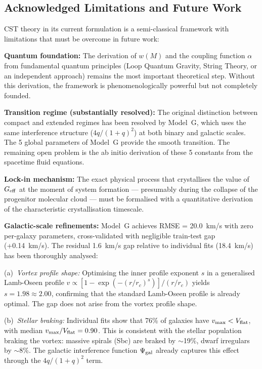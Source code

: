 \documentclass[11pt,a4paper]{article}
\begin{document}
\hypertarget{acknowledged-limitations-and-future-work}{%
\subsection{Acknowledged Limitations and Future
Work}\label{acknowledged-limitations-and-future-work}}

CST theory in its current formulation is a semi-classical framework with
limitations that must be overcome in future work:

\textbf{Quantum foundation:} The derivation of \(w(M)\) and the coupling
function \(\alpha\) from fundamental quantum principles (Loop Quantum
Gravity, String Theory, or an independent approach) remains the most
important theoretical step. Without this derivation, the framework is
phenomenologically powerful but not completely founded.

\textbf{Transition regime (substantially resolved):} The original distinction between compact and extended regimes has been resolved by Model~G, which uses the same interference structure (\(4q/(1+q)^2\)) at both binary and galactic scales. The 5 global parameters of Model~G provide the smooth transition. The remaining open problem is the ab initio derivation of these 5 constants from the spacetime fluid equations.

\textbf{Lock-in mechanism:} The exact physical process that crystallises
the value of \(G_{\rm eff}\) at the moment of system formation ---
presumably during the collapse of the progenitor molecular cloud ---
must be formalised with a quantitative derivation of the characteristic
crystallisation timescale.

\textbf{Galactic-scale refinements:} Model~G achieves RMSE = 20.0~km/s with zero per-galaxy parameters, cross-validated with negligible train-test gap (+0.14~km/s). The residual 1.6~km/s gap relative to individual fits (18.4~km/s) has been thoroughly analysed:

(a)~\textit{Vortex profile shape:} Optimising the inner profile exponent $s$ in a generalised Lamb-Oseen profile $v \propto [1 - \exp(-(r/r_c)^s)] / (r/r_c)$ yields $s = 1.98 \approx 2.00$, confirming that the standard Lamb-Oseen profile is already optimal. The gap does not arise from the vortex profile shape.

(b)~\textit{Stellar braking:} Individual fits show that 76\% of galaxies have $v_{\rm max} < V_{\rm flat}$, with median $v_{\rm max}/V_{\rm flat} = 0.90$. This is consistent with the stellar population braking the vortex: massive spirals (Sbc) are braked by $\sim$19\%, dwarf irregulars by $\sim$8\%. The galactic interference function $\Psi_{\rm gal}$ already captures this effect through the $4q/(1+q)^2$ term.
\end{document}

